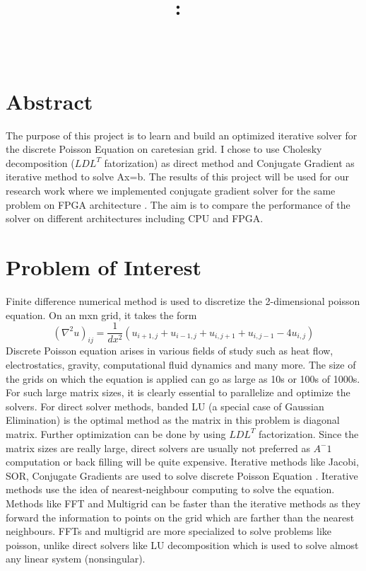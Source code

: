 \documentclass{article}
\title{\vspace{2in}\textmd{\textbf{\hmwkClass:\ \hmwkTitle}} \\
\vspace{0.1in}\large{ \hmwkClassTime}\vspace{3in}}
\author{\textbf{\hmwkAuthorName} \\ \vspace{0.1in}
\hmwkDueDate }
\date{} %
\begin{document}
\begin{spacing}{1.1}
\maketitle

\newpage
\section*{Abstract}

The purpose of this project is to learn and build an optimized iterative solver for the discrete Poisson Equation on caretesian grid.
I chose to use Cholesky decomposition ($LDL^T$ fatorization) as direct method and Conjugate Gradient as iterative method to solve {Ax=b}.
The results of this project will be used for our research work where we implemented conjugate gradient solver for the same problem on FPGA architecture \cite{FPGACG}. The aim is to compare the performance of the solver on different architectures including CPU and FPGA.
\section{Problem of Interest}

Finite difference numerical method is used to discretize the 2-dimensional poisson equation. On an m{x}n grid, it takes the form
\[(\nabla^2	u)_{ij} = \dfrac{1}{dx^2}(u_{i+1,j} + u_{i-1,j} + u_{i,j+1} + u_{i,j-1} - 4u_{i,j} ) \] 
	Discrete Poisson equation arises in various fields of study such as heat flow, electrostatics, gravity, computational fluid dynamics and many more. The size of the grids on which the equation is applied can go as large as 10s or 100s of 1000s. For such large matrix sizes, it is clearly essential to parallelize and optimize the solvers.
	For direct solver methods, banded LU (a special case of Gaussian Elimination) is the optimal method as the matrix in this problem is diagonal matrix. Further optimization can be done by using $LDL^T$ factorization.
	Since the matrix sizes are really large, direct solvers are usually not preferred as $A^-1$ computation or back filling will be quite expensive. Iterative methods like  Jacobi, SOR, Conjugate Gradients are used to solve discrete Poisson Equation \cite{Berkley1996} . Iterative methods use the idea of nearest-neighbour computing to solve the equation. Methods like FFT and Multigrid can be faster than the iterative methods as they forward the information to points on the grid which are farther than the nearest neighbours. FFTs and multigrid are more specialized to solve problems like poisson, unlike direct solvers like LU decomposition which is used to solve almost any linear system (nonsingular). \cite{FFTPoisson}


\end{spacing}
\end{document}
